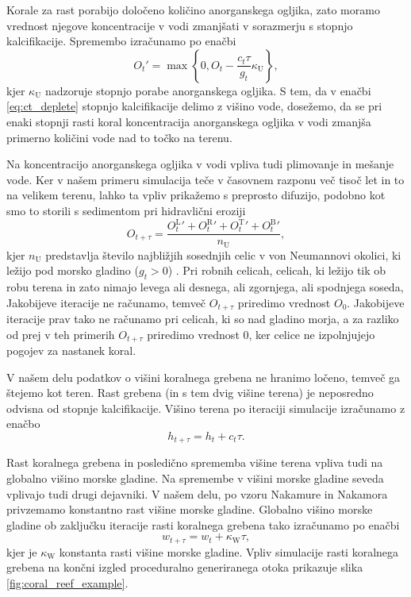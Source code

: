 \documentclass[9pt]{pnas-new}
\newcommand{\const}[1]{{\ensuremath{\kappa_\mathrm{#1}}}}
\begin{document}
Korale za rast porabijo določeno količino anorganskega ogljika, zato moramo vrednost njegove koncentracije v vodi zmanjšati v sorazmerju s stopnjo kalcifikacije. Spremembo izračunamo po enačbi
\begin{equation} \label{eq:ct_deplete}
{O_t}' = \max\left\{0, O_t - \frac{c_t\tau}{g_t} \const{U} \right\}, 
\end{equation}
kjer $\const{U}$ nadzoruje stopnjo porabe anorganskega ogljika. S tem, da v enačbi \eqref{eq:ct_deplete} stopnjo kalcifikacije delimo z višino vode,  dosežemo, da se pri enaki stopnji rasti koral koncentracija anorganskega ogljika v vodi zmanjša primerno količini vode nad to točko na terenu.

Na koncentracijo anorganskega ogljika v vodi vpliva tudi plimovanje in mešanje vode. Ker v našem primeru simulacija teče v časovnem razponu več tisoč let in to na velikem terenu, lahko ta vpliv prikažemo s preprosto difuzijo, podobno kot smo to storili s sedimentom pri hidravlični eroziji
\begin{equation} \label{eq:ct_diffusion_jacobi}
O_{t + \tau} = \frac{{O^\mathrm{L}_{t}}' + {O^\mathrm{R}_{t}}' + {O^\mathrm{T}_{t}}' + {O^\mathrm{B}_{t}}'}{n_\mathrm{U}},
\end{equation}
kjer $n_\mathrm{U}$ predstavlja število najbližjih sosednjih celic v von Neumannovi okolici, ki ležijo pod morsko gladino ($g_t > 0$) \cite{laplace_gpu}. Pri robnih celicah, celicah, ki ležijo tik ob robu terena in zato nimajo levega ali desnega, ali zgornjega, ali spodnjega soseda, Jakobijeve iteracije ne računamo, temveč $O_{t+\tau}$ priredimo vrednost $O_0$. Jakobijeve iteracije prav tako ne računamo pri celicah, ki so nad gladino morja, a za razliko od prej v teh primerih $O_{t+\tau}$ priredimo vrednost 0, ker celice ne izpolnjujejo pogojev za nastanek koral.

V našem delu podatkov o višini koralnega grebena ne hranimo ločeno, temveč ga štejemo kot teren. Rast grebena (in s tem dvig višine terena) je neposredno odvisna od stopnje kalcifikacije. Višino terena po iteraciji simulacije izračunamo z enačbo 
\begin{equation} \label{eq:final_h}
h_{t + \tau} = h_t + c_t \tau.
\end{equation}

Rast koralnega grebena in posledično sprememba višine terena vpliva tudi na globalno višino morske gladine. Na spremembe v višini morske gladine seveda vplivajo tudi drugi dejavniki. V našem delu, po vzoru Nakamure in Nakamora \cite{nakamura_reef_simulation_11} privzemamo konstantno rast višine morske gladine. Globalno višino morske gladine ob zaključku iteracije rasti koralnega grebena tako izračunamo po enačbi 
\begin{equation} \label{eq:water_height_raise}
w_{t+\tau} = w_t + \const{W} \tau,
\end{equation}
kjer je $\const{W}$ konstanta rasti višine morske gladine. Vpliv simulacije rasti koralnega grebena na končni izgled proceduralno generiranega otoka prikazuje slika \ref{fig:coral_reef_example}.
\end{document}
